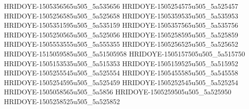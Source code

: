 HRIDOYE-1505356565u505_5a535656
HRIDOYE-1505254575u505_5a525457
HRIDOYE-1505256585u505_5a525658
HRIDOYE-1505359535u505_5a535953
HRIDOYE-1505351595u505_5a535159
HRIDOYE-1505357565u505_5a535756
HRIDOYE-1505250565u505_5a525056
HRIDOYE-1505258595u505_5a525859
HRIDOYE-1505553555u505_5a555355
HRIDOYE-1505256525u505_5a525652
HRIDOYE-1515059585u505_5a51505958
HRIDOYE-1505157505u505_5a515750
HRIDOYE-1505153535u505_5a515353
HRIDOYE-1505159525u505_5a515952
HRIDOYE-1505255545u505_5a525554
HRIDOYE-1505455585u505_5a545558
HRIDOYE-1505254595u505_5a525459
HRIDOYE-1505252545u505_5a525254
HRIDOYE-1505058565u505_5a5856
HRIDOYE-1505259505u505_5a525950
HRIDOYE-1505258525u505_5a525852
